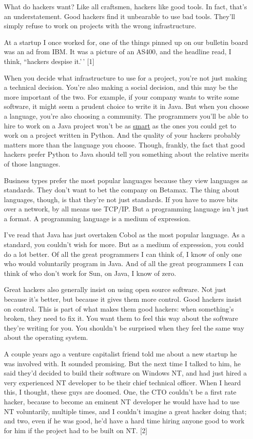 What do hackers want? Like all craftsmen, hackers like good tools. In
fact, that's an understatement. Good hackers find it unbearable to use
bad tools. They'll simply refuse to work on projects with the wrong
infrastructure.

At a startup I once worked for, one of the things pinned up on our
bulletin board was an ad from IBM. It was a picture of an AS400, and the
headline read, I think, ``hackers despise it.'\,' {[}1{]}

When you decide what infrastructure to use for a project, you're not
just making a technical decision. You're also making a social decision,
and this may be the more important of the two. For example, if your
company wants to write some software, it might seem a prudent choice to
write it in Java. But when you choose a language, you're also choosing a
community. The programmers you'll be able to hire to work on a Java
project won't be as \href{pypar.html}{smart} as the ones you could get
to work on a project written in Python. And the quality of your hackers
probably matters more than the language you choose. Though, frankly, the
fact that good hackers prefer Python to Java should tell you something
about the relative merits of those languages.

Business types prefer the most popular languages because they view
languages as standards. They don't want to bet the company on Betamax.
The thing about languages, though, is that they're not just standards.
If you have to move bits over a network, by all means use TCP/IP. But a
programming language isn't just a format. A programming language is a
medium of expression.

I've read that Java has just overtaken Cobol as the most popular
language. As a standard, you couldn't wish for more. But as a medium of
expression, you could do a lot better. Of all the great programmers I
can think of, I know of only one who would voluntarily program in Java.
And of all the great programmers I can think of who don't work for Sun,
on Java, I know of zero.

Great hackers also generally insist on using open source software. Not
just because it's better, but because it gives them more control. Good
hackers insist on control. This is part of what makes them good hackers:
when something's broken, they need to fix it. You want them to feel this
way about the software they're writing for you. You shouldn't be
surprised when they feel the same way about the operating system.

A couple years ago a venture capitalist friend told me about a new
startup he was involved with. It sounded promising. But the next time I
talked to him, he said they'd decided to build their software on Windows
NT, and had just hired a very experienced NT developer to be their chief
technical officer. When I heard this, I thought, these guys are doomed.
One, the CTO couldn't be a first rate hacker, because to become an
eminent NT developer he would have had to use NT voluntarily, multiple
times, and I couldn't imagine a great hacker doing that; and two, even
if he was good, he'd have a hard time hiring anyone good to work for him
if the project had to be built on NT. {[}2{]}

